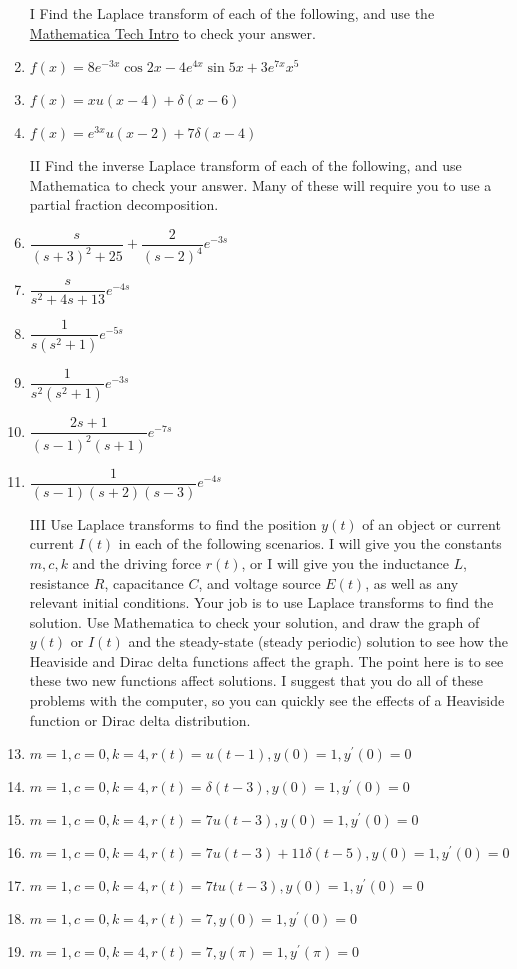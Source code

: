 \begin{enumerate}
\item[I] Find the Laplace transform of each of the following, and use the \href{\urlmathematicatechintro}{Mathematica Tech Intro} to check your answer.
\item $f(x) = 8e^{-3x}\cos 2x -4e^{4x}\sin 5x+3e^{7x}x^5$
\item $f(x) = xu(x-4)+\delta(x-6)$
\item $f(x) = e^{3x}u(x-2)+7\delta(x-4)$

\item[II] Find the inverse Laplace transform of each of the following, and use Mathematica to check your answer. Many of these will require you to use a partial fraction decomposition.
\item $\dfrac{s}{(s+3)^2+25}+\dfrac{2}{(s-2)^4}e^{-3s}$
\item $\dfrac{s}{s^2+4s+13}e^{-4s}$
\item $\dfrac{1}{s(s^2+1)}e^{-5s}$
\item $\dfrac{1}{s^2(s^2+1)}e^{-3s}$
\item $\dfrac{2s+1}{(s-1)^2(s+1)}e^{-7s}$
\item $\dfrac{1}{(s-1)(s+2)(s-3)}e^{-4s}$

\item[III] Use Laplace transforms to find the position $y(t)$ of an object or current current $I(t)$ in each of the following scenarios. I will give you the constants $m,c,k$ and the driving force $r(t)$, or I will give you the inductance $L$, resistance $R$, capacitance $C$, and voltage source $E(t)$, as well as any relevant initial conditions.  Your job is to use Laplace transforms to find the solution. Use Mathematica to check your solution, and draw the graph of $y(t)$ or $I(t)$ and the steady-state (steady periodic) solution to see how the Heaviside and Dirac delta functions affect the graph. The point here is to see these two new functions affect solutions. I suggest that you do all of these problems with the computer, so you can quickly see the effects of a Heaviside function or Dirac delta distribution.
\item $m = 1, c = 0, k=4, r(t)=u(t-1), y(0)=1,y^\prime(0)=0$
\item $m = 1, c = 0, k=4, r(t)=\delta(t-3), y(0)=1,y^\prime(0)=0$
\item $m = 1, c = 0, k=4, r(t)=7u(t-3), y(0)=1,y^\prime(0)=0$
\item $m = 1, c = 0, k=4, r(t)=7u(t-3)+11\delta(t-5), y(0)=1,y^\prime(0)=0$
\item $m = 1, c = 0, k=4, r(t)=7t u(t-3), y(0)=1,y^\prime(0)=0$
\item $m = 1, c = 0, k=4, r(t)=7, y(0)=1,y^\prime(0)=0$
\item $m = 1, c = 0, k=4, r(t)=7, y(\pi)=1,y^\prime(\pi)=0$


\end{enumerate}
